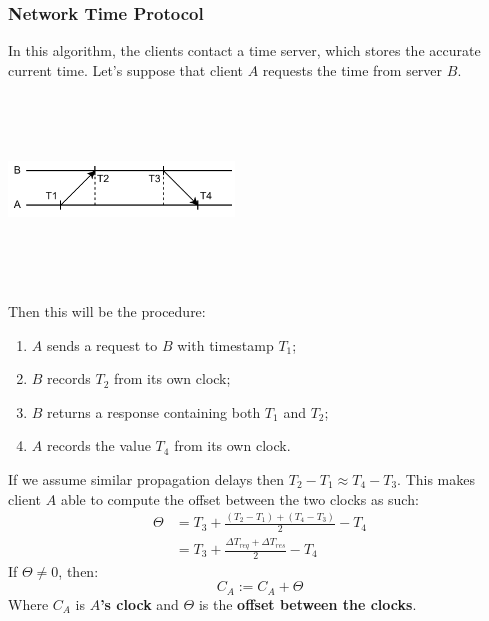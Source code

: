 \documentclass{article}
\begin{document}
\subsubsection{Network Time Protocol}
In this algorithm, the clients contact a time server, which stores the accurate current time. Let's suppose that client $A$ requests the time from server $B$.
\begin{center}
	\includegraphics[width=6cm, height=5cm, keepaspectratio]{assets/network-time-protocol.pdf}
\end{center}
Then this will be the procedure:
\begin{enumerate}
	\item $A$ sends a request to $B$ with timestamp $T_1$;
	\item $B$ records $T_2$ from its own clock;
	\item $B$ returns a response containing both $T_1$ and $T_2$;
	\item $A$ records the value $T_4$ from its own clock.
\end{enumerate}
If we assume similar propagation delays then $T_2 - T_1 \approx T_4 - T_3$. This makes client $A$ able to compute the offset between the two clocks as such:
\begin{align*}
	\Theta & = T_3 + \frac{(T_2 - T_1) + (T_4 - T_3)}{2} - T_4 \\[10pt]
	& = T_3 + \frac{\Delta T_{req} + \Delta T_{res}}{2} - T_4
\end{align*}
If $\Theta \neq 0$, then:
\[ C_A := C_A + \Theta \]
Where $C_A$ is \textbf{$A$'s clock} and $\Theta$ is the \textbf{offset between the clocks}.
\end{document}
